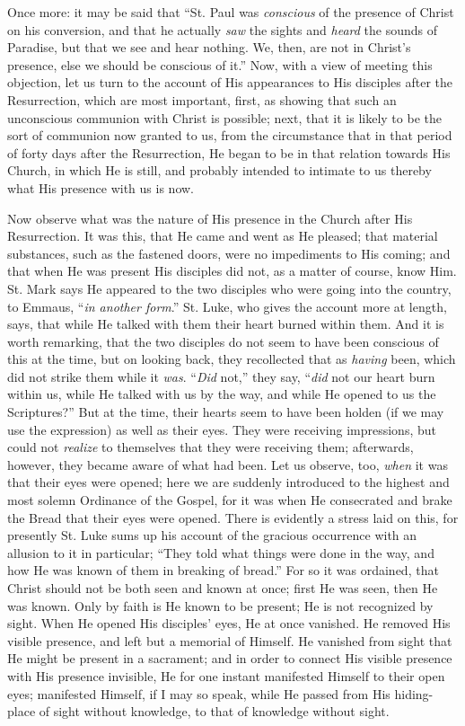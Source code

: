 Once more: it may be said that ``St. Paul was \emph{conscious} of
the presence of Christ on his conversion, and that he actually \emph{saw}
the sights and \emph{heard} the sounds of Paradise, but that we see and
hear nothing. We, then, are not in Christ's presence, else we should be
conscious of it.'' Now, with a view of meeting this objection, let
us turn to the account of His appearances to His disciples after the
Resurrection, which are most important, first, as showing that such an
unconscious communion with Christ is possible; next, that it is likely
to be the sort of communion now granted to us, from the circumstance
that in that period of forty days after the Resurrection, He began to be
in that relation towards His Church, in which He is still, and probably
intended to intimate to us thereby what His presence with us is now.

Now observe what was the nature of His presence in the Church after
His Resurrection. It was this, that He came and went as He pleased; that
material substances, such as the fastened doors, were no impediments to
His coming; and that when He was present His disciples did not, as a
matter of course, know Him. St. Mark says He appeared to the two
disciples who were going into the country, to Emmaus, ``\emph{in
another form}.'' St. Luke, who gives the account more at length,
says, that while He talked with them their heart burned within them. And
it is worth remarking, that the two disciples do not seem to have been
conscious of this at the time, but on looking back, they recollected
that as \emph{having} been, which did not strike them while it \emph{was}.
``\emph{Did} not,'' they say, ``\emph{did} not our heart
burn within us, while He talked with us by the way, and while He opened
to us the Scriptures?'' But at the time, their hearts seem to have
been holden (if we may use the expression) as well as their eyes. They
were receiving impressions, but could not \emph{realize} to themselves
that they were receiving them; afterwards, however, they became aware of
what had been. Let us observe, too, \emph{when} it was that their eyes
were opened; here we are suddenly introduced to the highest and most
solemn Ordinance of the Gospel, for it was when He consecrated and brake
the Bread that their eyes were opened. There is evidently a stress laid
on this, for presently St. Luke sums up his account of the gracious
occurrence with an allusion to it in particular; ``They told what
things were done in the way, and how He was known of them in breaking of
bread.'' For so it was ordained, that Christ should not be both seen
and known at once; first He was seen, then He was known. Only by faith
is He known to be present; He is not recognized by sight. When He opened
His disciples' eyes, He at once vanished. He removed His visible
presence, and left but a memorial of Himself. He vanished from sight
that He might be present in a sacrament; and in order to connect His
visible presence with His presence invisible, He for one instant
manifested Himself to their open eyes; manifested Himself, if I may so
speak, while He passed from His hiding-place of sight without knowledge,
to that of knowledge without sight.

